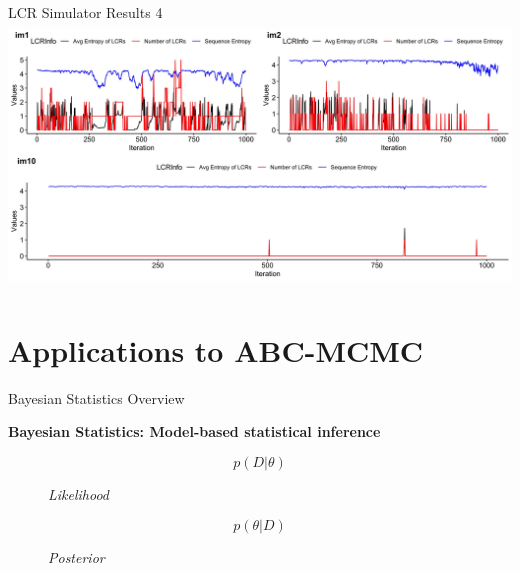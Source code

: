 \documentclass{beamer}
\begin{document}
	\begin{frame}{LCR Simulator Results 4}
		\includegraphics[height=7cm, width=\textwidth]{m1-2-10.jpeg}
	\end{frame}
	
	\section{Applications to ABC-MCMC}
	\begin{frame}{Bayesian Statistics Overview}
	
	\textbf{Bayesian Statistics: Model-based statistical inference}
	
	\begin{figure}
		
		\begin{equation} \tag{1}
			p(D|\theta)
		\end{equation}
	\caption{\textit{Likelihood}} \pause
	
		\begin{equation} \tag{2}
			p(\theta|D)
		\end{equation}
	\caption{\textit{Posterior}}
	
	\end{figure}
	
	\end{frame}
\end{document}
